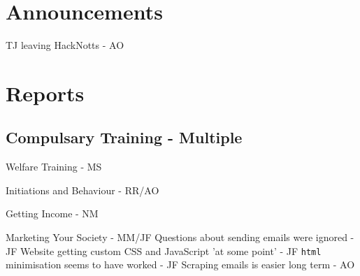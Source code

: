\documentclass[11pt,hacksoc]{meetingmins}
\begin{document}
\maketitle

\section{Announcements}
\begin{items}
\item TJ leaving HackNotts - AO
\end{items}

\section{Reports}
\subsection{Compulsary Training - Multiple}
\begin{hiddensubitems}
\item Welfare Training - MS
\item Initiations and Behaviour - RR/AO
\item Getting Income - NM
\item Marketing Your Society - MM/JF
  \subitem Questions about sending emails were ignored - JF
  \subitem Website getting custom CSS and JavaScript 'at some point' - JF
  \subitem \verb|html| minimisation seems to have worked - JF
  \subitem Scraping emails is easier long term - AO
\end{hiddensubitems}
\end{document}

